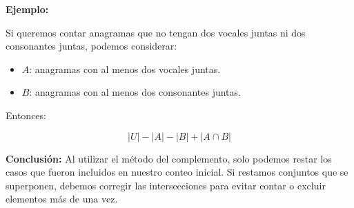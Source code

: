 \begin{definicion}
\textbf{Ejemplo:}

Si queremos contar anagramas que no tengan dos vocales juntas ni dos consonantes juntas, podemos considerar:

\begin{itemize}
    \item $A$: anagramas con al menos dos vocales juntas.
    \item $B$: anagramas con al menos dos consonantes juntas.
\end{itemize}

Entonces:

\[
    \boxed{
    |U| - |A| - |B| + |A \cap B|
    }
\]

\textbf{Conclusión:} Al utilizar el método del complemento, solo podemos restar los casos que fueron incluidos en nuestro conteo inicial. Si restamos conjuntos que se superponen, debemos corregir las intersecciones para evitar contar o excluir elementos más de una vez.

\end{definicion}
